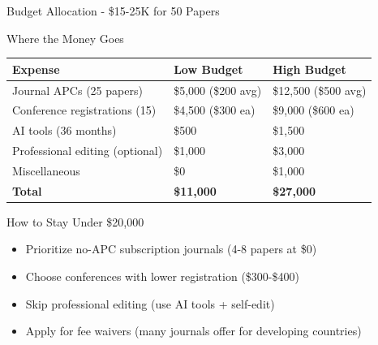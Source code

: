 \documentclass[11pt]{beamer}
\begin{document}
	\begin{frame}{Budget Allocation - \$15-25K for 50 Papers}
		\scriptsize
		\begin{block}{Where the Money Goes}
			\centering
			\begin{tabular}{|p{4cm}|p{3cm}|p{3cm}|}
				\hline
				\textbf{Expense} & \textbf{Low Budget} & \textbf{High Budget} \\
				\hline
				Journal APCs (25 papers) & \$5,000 (\$200 avg) & \$12,500 (\$500 avg) \\
				\hline
				Conference registrations (15) & \$4,500 (\$300 ea) & \$9,000 (\$600 ea) \\
				\hline
				AI tools (36 months) & \$500 & \$1,500 \\
				\hline
				Professional editing (optional) & \$1,000 & \$3,000 \\
				\hline
				Miscellaneous & \$0 & \$1,000 \\
				\hline
				\textbf{Total} & \textbf{\$11,000} & \textbf{\$27,000} \\
				\hline
			\end{tabular}
		\end{block}
		\begin{block}{How to Stay Under \$20,000}
			\begin{itemize}
				\item Prioritize no-APC subscription journals (4-8 papers at \$0)
				\item Choose conferences with lower registration (\$300-\$400)
				\item Skip professional editing (use AI tools + self-edit)
				\item Apply for fee waivers (many journals offer for developing countries)
			\end{itemize}
		\end{block}
	\end{frame}
	
\end{document}
